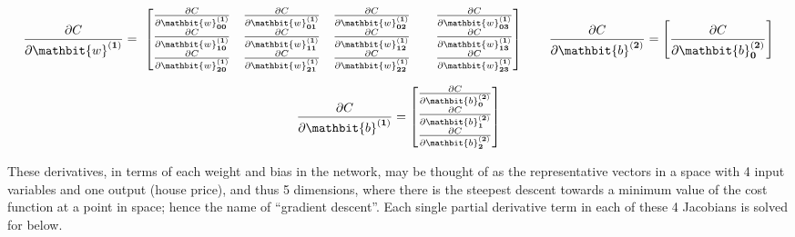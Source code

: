 \documentclass[12pt,a4paper]{article}
\begin{document}
\begin{equation}
\frac{\partial C}{\partial\mathbit{w}^{\left(\mathbf{1}\right)}}=\ \left[\begin{matrix}\frac{\partial C}{\partial\mathbit{w}_{\mathbf{00}}^{\left(\mathbf{1}\right)}}&\frac{\partial C}{\partial\mathbit{w}_{\mathbf{01}}^{\left(\mathbf{1}\right)}}&\frac{\partial C}{\partial\mathbit{w}_{\mathbf{02}}^{\left(\mathbf{1}\right)}}\\\frac{\partial C}{\partial\mathbit{w}_{\mathbf{10}}^{\left(\mathbf{1}\right)}}&\frac{\partial C}{\partial\mathbit{w}_{\mathbf{11}}^{\left(\mathbf{1}\right)}}&\frac{\partial C}{\partial\mathbit{w}_{\mathbf{12}}^{\left(\mathbf{1}\right)}}\\\frac{\partial C}{\partial\mathbit{w}_{\mathbf{20}}^{\left(\mathbf{1}\right)}}&\frac{\partial C}{\partial\mathbit{w}_{\mathbf{21}}^{\left(\mathbf{1}\right)}}&\frac{\partial C}{\partial\mathbit{w}_{\mathbf{22}}^{\left(\mathbf{1}\right)}}\\\end{matrix}
\qquad
\begin{matrix}\frac{\partial C}{\partial\mathbit{w}_{\mathbf{03}}^{\left(\mathbf{1}\right)}}\\\frac{\partial C}{\partial\mathbit{w}_{\mathbf{13}}^{\left(\mathbf{1}\right)}}\\\frac{\partial C}{\partial\mathbit{w}_{\mathbf{23}}^{\left(\mathbf{1}\right)}}\\\end{matrix}\right]	
\qquad
\frac{\partial C}{\partial\mathbit{b}^{\left(\mathbf{2}\right)}}=\left[\frac{\partial C}{\partial\mathbit{b}_\mathbf{0}^{\left(\mathbf{2}\right)}}\right]
\end{equation}

\begin{equation}
\frac{\partial C}{\partial\mathbit{b}^{\left(\mathbf{1}\right)}}=\left[\begin{matrix}\frac{\partial C}{\partial\mathbit{b}_\mathbf{0}^{\left(\mathbf{2}\right)}}\\\frac{\partial C}{\partial\mathbit{b}_\mathbf{1}^{\left(\mathbf{2}\right)}}\\\frac{\partial C}{\partial\mathbit{b}_\mathbf{2}^{\left(\mathbf{2}\right)}}\\\end{matrix}\right]
\end{equation}



These derivatives, in terms of each weight and bias in the network, may be thought of as the representative vectors in a space with 4 input variables and one output (house price), and thus 5 dimensions, where there is the steepest descent towards a minimum value of the cost function at a point in space; hence the name of “gradient descent”. Each single partial derivative term in each of these 4 Jacobians is solved for below.
\end{document}
